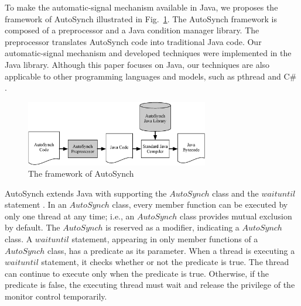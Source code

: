 \documentclass[preprint]{sigplanconf}
\begin{document}
To make the automatic-signal mechanism available in Java, we proposes the 
framework of AutoSynch illustrated in Fig.~\ref{fig:fw}. 
The AutoSynch framework is composed of a 
preprocessor and a Java condition manager library. The preprocessor translates 
AutoSynch code into traditional Java code. Our automatic-signal mechanism and 
developed techniques were implemented in the Java library. Although this paper 
focuses on Java, our techniques are also applicable to other programming 
languages and models, such as pthread and C\# \cite{hwg03}.

%
\begin{figure}[ht!]
  \centering
  \includegraphics[width=80mm]{fig/flow.eps}
  \caption{The framework of AutoSynch}
  \label{fig:fw}
\end{figure}


AutoSynch extends Java with supporting the $AutoSynch$ class and the
$waituntil$ statement \cite{gm05}. In an $AutoSynch$ class, every member 
function can be executed by 
only one thread at any time; i.e., an $AutoSynch$ class provides  
mutual exclusion by default. The $AutoSynch$ is reserved as a modifier, 
indicating a $AutoSynch$ class. A $waituntil$ statement, appearing in 
only member functions of a $AutoSynch$ class, has a predicate as its parameter. 
When a thread is executing a $waituntil$ statement, it checks whether or not the 
predicate is true. The thread can continue to execute only when the predicate
is true. Otherwise, if the predicate is false, the executing thread must wait 
and release the privilege of the monitor control temporarily. 
\end{document}
